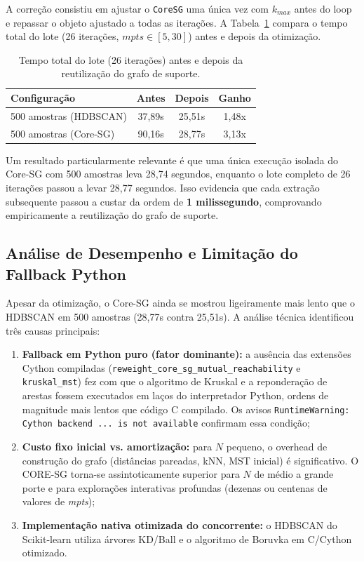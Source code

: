 \documentclass[12pt,a4paper,oneside]{article}
\begin{document}
A correção consistiu em ajustar o \texttt{CoreSG} uma única vez com $k_{max}$ antes do loop e
repassar o objeto ajustado a todas as iterações. A Tabela~\ref{tab:dell_depois} compara o
tempo total do lote (26 iterações, $mpts \in [5,30]$) antes e depois da otimização.

\begin{table}[htbp]
  \centering
  \caption{Tempo total do lote (26 iterações) antes e depois da reutilização do grafo de
           suporte.}
  \label{tab:dell_depois}
  \begin{tabular}{lccc}
    \toprule
    \textbf{Configuração} & \textbf{Antes} & \textbf{Depois} & \textbf{Ganho} \\
    \midrule
    500 amostras (HDBSCAN) & 37,89s & 25,51s & 1,48x \\
    500 amostras (Core-SG) & 90,16s & 28,77s & 3,13x \\
    \bottomrule
  \end{tabular}
\end{table}

Um resultado particularmente relevante é que uma única execução isolada do Core-SG com 500
amostras leva 28,74 segundos, enquanto o lote completo de 26 iterações passou a levar 28,77
segundos. Isso evidencia que cada extração subsequente passou a custar da ordem de
\textbf{1 milissegundo}, comprovando empiricamente a reutilização do grafo de suporte.

\subsection{Análise de Desempenho e Limitação do Fallback Python}

Apesar da otimização, o Core-SG ainda se mostrou ligeiramente mais lento que o HDBSCAN em 500
amostras (28,77s contra 25,51s). A análise técnica identificou três causas principais:

\begin{enumerate}
  \item \textbf{Fallback em Python puro (fator dominante):} a ausência das extensões Cython
        compiladas (\texttt{reweight\_core\_sg\_mutual\_reachability} e \texttt{kruskal\_mst})
        fez com que o algoritmo de Kruskal e a reponderação de arestas fossem executados em
        laços do interpretador Python, ordens de magnitude mais lentos que código C compilado.
        Os avisos \texttt{RuntimeWarning: Cython backend ... is not available} confirmam essa
        condição;
  \item \textbf{Custo fixo inicial vs. amortização:} para $N$ pequeno, o overhead de construção
        do grafo (distâncias pareadas, kNN, MST inicial) é significativo. O CORE-SG torna-se
        assintoticamente superior para $N$ de médio a grande porte e para explorações
        interativas profundas (dezenas ou centenas de valores de \textit{mpts});
  \item \textbf{Implementação nativa otimizada do concorrente:} o HDBSCAN do Scikit-learn
        utiliza árvores KD/Ball e o algoritmo de Boruvka em C/Cython otimizado.
\end{enumerate}
\end{document}
